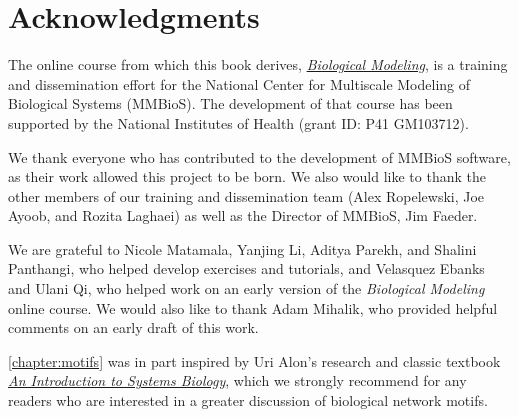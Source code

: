 {\begin{tabular}[]{l @{\hskip 0.05\textwidth} l}
\end{tabular}
}

\newpage


 
\clearpage
{}
\chapter{Acknowledgments}
\label{chapter:acknowledgments}

The online course from which this book derives, \href{https://biologicalmodeling.org}{\textit{Biological Modeling}}, is a training and dissemination effort for the National Center for Multiscale Modeling of Biological Systems (MMBioS). The development of that course has been supported by the National Institutes of Health (grant ID: P41 GM103712).

We  thank everyone who has contributed to the development of MMBioS software, as their work allowed this project to be born. We also would like to thank the other members of our training and dissemination team (Alex Ropelewski, Joe Ayoob, and Rozita Laghaei) as well as the Director of MMBioS, Jim Faeder.

We are grateful to Nicole Matamala, Yanjing Li, Aditya Parekh, and Shalini Panthangi, who helped develop exercises and tutorials, and Velasquez Ebanks and Ulani Qi, who helped work on an early version of the \textit{Biological Modeling} online course. We would also like to thank Adam Mihalik, who provided helpful comments on an early draft of this work.

\autoref{chapter:motifs} was in part inspired by Uri Alon’s research and classic textbook \href{https://www.weizmann.ac.il/mcb/UriAlon/introduction-systems-biology-design-principles-biological-circuits}{\textit{An Introduction to Systems Biology}}, which we strongly recommend for any readers who are interested in a greater discussion of biological network motifs.

